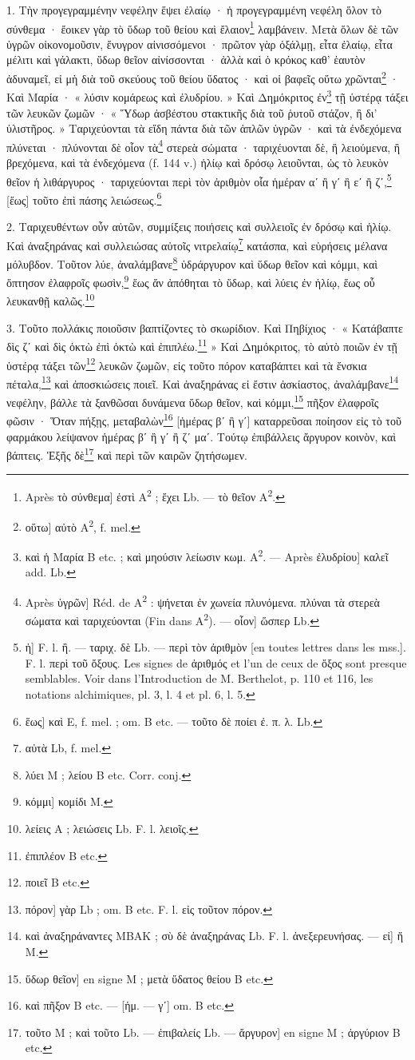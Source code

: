 \documentclass[landscape, a4paper, 11pt, oneside, polutonikogreek, french]{article}
\begin{document}
\bigskip

1. Τὴν προγεγραμμένην νεφέλην ἕψει ἐλαίῳ · ἡ προγεγραμμένη νεφέλη ὅλον τὸ σύνθεμα · ἔοικεν γὰρ τὸ ὕδωρ τοῦ θείου καὶ ἔλαιον\footnote{Après τὸ σύνθεμα] ἐστὶ A\textsuperscript{2} ; ἔχει Lb. --- τὸ θεῖον A\textsuperscript{2}.} λαμβάνειν. Μετὰ ὅλων δὲ τῶν ὑγρῶν οἰκονομοῦσιν, ἔνυγρον αἰνισσόμενοι · πρῶτον γὰρ ὀξάλμῃ, εἶτα ἐλαίῳ, εἶτα μέλιτι καὶ γάλακτι, ὕδωρ θεῖον αἰνίσσονται · ἀλλὰ καὶ ὁ κρόκος καθ' ἑαυτὸν ἀδυναμεῖ, εἰ μὴ διὰ τοῦ σκεύους τοῦ θείου ὕδατος · καὶ οἱ βαφεῖς οὕτω χρῶνται\footnote{οὕτω] αὐτὸ A\textsuperscript{2}, f. mel.} · Καὶ Μαρία · « λύσιν κομάρεως καὶ ἐλυδρίου. » Καὶ Δημόκριτος ἐν\footnote{καὶ ἡ Mαρία B etc. ; καὶ μηούσιν λείωσιν κωμ. A\textsuperscript{2}. --- Après ἐλυδρίου] καλεῖ add. Lb.} τῇ ὑστέρᾳ τάξει τῶν λευκῶν ζωμῶν · « Ὕδωρ ἀσβέστου στακτικῆς διὰ τοῦ ῥυτοῦ στάζον, ἢ δι' ὑλιστῆρος. » Ταριχεύονται τὰ εἴδη πάντα διὰ τῶν ἁπλῶν ὑγρῶν · καὶ τὰ ἐνδεχόμενα πλύνεται · πλύνονται δὲ οἷον τὰ\footnote{Après ὑγρῶν] Réd. de A\textsuperscript{2} : ψήνεται ἐν χωνεία πλυνόμενα. πλύναι τὰ στερεὰ σώματα καὶ ταριχεύονται (Fin dans A\textsuperscript{2}). --- οἷον] ὥσπερ Lb.} στερεὰ σώματα · ταριχέυονται δὲ, ἢ λειούμενα, ἢ βρεχόμενα, καὶ τὰ ἐνδεχόμενα (f. 144 v.) ἡλίῳ καὶ δρόσῳ λειοῦνται, ὡς τὸ λευκὸν θεῖον ἡ λιθάργυρος · ταριχεύονται περὶ τὸν ἀριθμὸν οἷα ἡμέραν αʹ ἢ γʹ ἢ εʹ ἢ ζʹ,\footnote{ἡ] F. l. ἢ. --- ταριχ. δὲ Lb. --- περὶ τὸν ἀριθμὸν [en toutes lettres dans les mss.]. F. l. περὶ τοῦ ὄξους. Les signes de ἀριθμός et l'un de ceux de ὄξος sont presque semblables. Voir dans l'Introduction de M. Berthelot, p. 110 et 116, les notations alchimiques, pl. 3, l. 4 et pl. 6, l. 5.} [ἕως] τοῦτο ἐπὶ πάσης λειώσεως.\footnote{ἕως] καὶ E, f. mel. ; om. B etc. --- τοῦτο δὲ ποίει ἐ. π. λ. Lb.}

2. Ταριχευθέντων οὖν αὐτῶν, συμμίξεις ποιήσεις καὶ συλλειοῖς ἐν δρόσῳ καὶ ἡλίῳ. Καὶ ἀναξηράνας καὶ συλλειώσας αὐτοῖς νιτρελαίῳ\footnote{αὐτὰ Lb, f. mel.} κατάσπα, καὶ εὑρήσεις μέλανα μόλυβδον. Τοῦτον λύε, ἀναλάμβανε\footnote{λύει M ; λείου B etc. Corr. conj.} ὑδράργυρον καὶ ὕδωρ θεῖον καὶ κόμμι, καὶ ὄπτησον ἐλαφροῖς φωσὶν,\footnote{κόμμι] κομίδι M.} ἕως ἄν ἀπόθηται τὸ ὕδωρ, καὶ λύεις ἐν ἡλίῳ, ἕως οὗ λευκανθῇ καλῶς.\footnote{λείεις A ; λειώσεις Lb. F. l. λειοῖς.}

3. Τοῦτο πολλάκις ποιοῦσιν βαπτίζοντες τὸ σκωρίδιον. Καὶ Πηβίχιος · « Κατάβαπτε δὶς ζʹ καὶ δὶς ὀκτὼ ἐπὶ ὀκτὼ καὶ ἐπιπλέω.\footnote{ἐπιπλέον B etc.} » Καὶ Δημόκριτος, τὸ αὐτὸ ποιῶν ἐν τῇ ὑστέρᾳ τάξει τῶν\footnote{ποιεῖ B etc.} λευκῶν ζωμῶν, εἰς τοῦτο πόρον καταβάπτει καὶ τὰ ἔνσκια πέταλα,\footnote{πόρον] γὰρ Lb ; om. B etc. F. l. εἰς τοῦτον πόρον.} καὶ ἀποσκιώσεις ποιεῖ. Καὶ ἀναξηράνας εἰ ἔστιν ἀσκίαστος, ἀναλάμβανε\footnote{καὶ ἀναξηράναντες MBAK ; σὺ δὲ ἀναξηράνας Lb. F. l. ἀνεξερευνήσας. --- εἰ] ἥ M.} νεφέλην, βάλλε τὰ ξανθῶσαι δυνάμενα ὕδωρ θεῖον, καὶ κόμμι,\footnote{ὕδωρ θεῖον] en signe M ; μετὰ ὕδατος θείου B etc.} πῆξον ἐλαφροῖς φῶσιν · Ὅταν πήξῃς, μεταβαλὼν\footnote{καὶ πῆξον B etc. --- [ἡμ. --- γʹ] om. B etc.} [ἡμέρας βʹ ἢ γʹ] καταρρεῦσαι ποίησον εἰς τὸ τοῦ φαρμάκου λείψανον ἡμέρας βʹ ἢ γʹ ἢ ζʹ μαʹ. Τούτῳ ἐπιβάλλεις ἄργυρον κοινὸν, καὶ βάπτεις. Ἑξῆς δὲ\footnote{τοῦτο M ; καὶ τοῦτο Lb. --- ἐπιβαλείς Lb. --- ἄργυρον] en signe M ; ἀργύριον B etc.} καὶ περὶ τῶν καιρῶν ζητήσωμεν.
\end{document}

